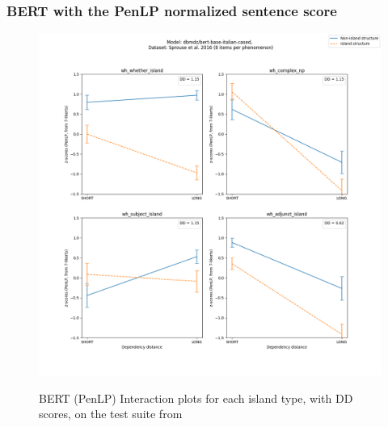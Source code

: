 \subsubsection{BERT with the PenLP normalized sentence score}
\begin{figure}[h]
	\centering
	\includegraphics[width=1\textwidth]{images/AppendixA/Sprouse_wh_dbmdz_bert-base-italian-cased_PenLP-zscores-likert-2022-09-17_h11m04s22.png} 
	\label{A-fig:sprouse_bert2b_penlp}
	\caption{BERT (PenLP) Interaction plots for each island type, with DD scores, on the test suite from \citet{sprouse2016experimental}}
\end{figure}
\clearpage

